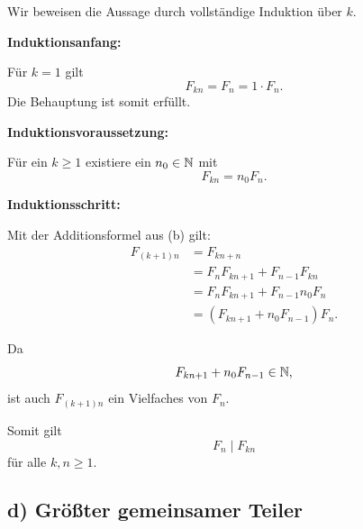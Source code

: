 \documentclass{report}
\begin{document}
\begin{myproof}
  Wir beweisen die Aussage durch vollständige
  Induktion über $k$.

  \textbf{Induktionsanfang:}

  Für $k=1$ gilt
  \[
    F_{kn}=F_n=1\cdot F_n.
  \]
  Die Behauptung ist somit erfüllt.

  \textbf{Induktionsvoraussetzung:}

  Für ein $k\ge1$ existiere
  ein $n_0\in\mathbb{N}$ mit
  \[
    F_{kn}=n_0F_n.
  \]

  \textbf{Induktionsschritt:}

  Mit der Additionsformel aus (b) gilt:
  \begin{align*}
    F_{(k+1)n}
    &=F_{kn+n}\\
    &=F_nF_{kn+1}+F_{n-1}F_{kn}\\
    &=F_nF_{kn+1}+F_{n-1}n_0F_n\\
    &=(F_{kn+1}+n_0F_{n-1})F_n.
  \end{align*}

  Da
  \[
    F_{kn+1}+n_0F_{n-1}\in\mathbb{N},
  \]
  ist auch $F_{(k+1)n}$ ein Vielfaches
  von $F_n$.

  Somit gilt
  \[
    \boxed{F_n\mid F_{kn}}
  \]
  für alle $k,n\ge1$.
\end{myproof}


\subsection*{d) Größter gemeinsamer Teiler}
\end{document}
